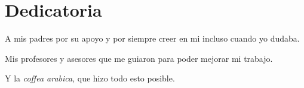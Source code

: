
\chapter*{Dedicatoria}


A mis padres por su apoyo y por siempre creer en mi incluso cuando yo dudaba.

Mis profesores y asesores que me guiaron para poder mejorar mi trabajo.

Y la \textit{coffea arabica}, que hizo todo esto posible.


